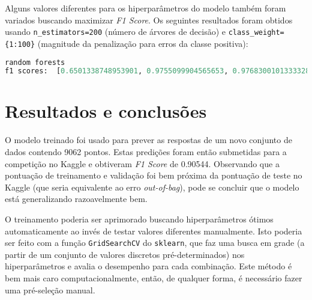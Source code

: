 \documentclass[12pt]{article}
\begin{document}
Alguns valores diferentes para os hiperparâmetros do modelo também foram variados buscando maximizar \emph{F1 Score}. Os seguintes resultados foram obtidos usando \texttt{n\_estimators=200} (número de árvores de decisão) e \texttt{class\_weight=\{1:100\}} (magnitude da penalização para erros da classe positiva):

\begin{lstlisting}[language=Python]
random forests
f1 scores:  [0.6501338748953901, 0.9755099904565653, 0.9768300101333328, 0.9760509360775623, 0.9557751402284679] ; mean:  0.9068599903582637
\end{lstlisting}


\section{Resultados e conclusões}

O modelo treinado foi usado para prever as respostas de um novo conjunto de dados contendo 9062 pontos. Estas predições foram então submetidas para a competição no Kaggle e obtiveram \emph{F1 Score} de 0.90544. Observando que a pontuação de treinamento e validação foi bem próxima da pontuação de teste no Kaggle (que seria equivalente ao erro \emph{out-of-bag}), pode se concluir que o modelo está generalizando razoavelmente bem.

O treinamento poderia ser aprimorado buscando hiperparâmetros ótimos automaticamente ao invés de testar valores diferentes manualmente. Isto poderia ser feito com a função \texttt{GridSearchCV} do \texttt{sklearn}, que faz uma busca em grade (a partir de um conjunto de valores discretos pré-determinados) nos hiperparâmetros e avalia o desempenho para cada combinação. Este método é bem mais caro computacionalmente, então, de qualquer forma, é necessário fazer uma pré-seleção manual.


% 
% 
\end{document}
